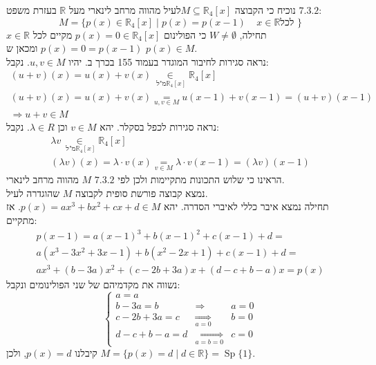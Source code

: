 \documentclass{article}
\newcommand\underrel[2]{\mathrel{\mathop{#2}\limits_{#1}}}
\DeclareMathOperator\Sp{Sp}
\begin{document}
נוכיח כי הקבוצה $M\subseteq \mathbb{R}_4[x]$לעיל מהווה מרחב לינארי מעל $\mathbb{R}$ בעזרת משפט $7.3.2$:
\[
    M=\{p(x)\in \mathbb{R}_4[x] \; | \; p(x) = p(x-1) \;\;\;\; x\in \mathbb{R} \text{לכל } \}
\]
תחילה, $W\ne \emptyset$
כי הפולינום $p(x)=0\in \mathbb{R}_4[x]$ מקיים לכל $x\in \mathbb{R}$ $p(x)=0=p(x-1)$ ומכאן ש $p(x)\in M$.\\
נראה סגירות לחיבור המוגדר בעמוד 155 בכרך ב. יהיו $u,v\in M$. נקבל:
\[
    \begin{matrix}
        (u + v)(x) = u(x)+v(x) \underrel{\text{ מ"ל} \mathbb{R}_4[x]}{\in} \mathbb{R}_4[x] \\
        (u+v)(x)=u(x)+v(x)\underrel{u,v\in M}{=} u(x-1)+v(x-1)=(u+v)(x-1)                  \\
        \Rightarrow u+v\in M
    \end{matrix}
\]
נראה סגירות לכפל בסקלר. יהא $v\in M$ וכן $\lambda \in R$. נקבל:
\[
    \begin{matrix}
        \lambda v \underrel{\text{ מ"ל} \mathbb{R}_4[x]}{\in} \mathbb{R}_4[x] \\
        (\lambda v)(x) = \lambda \cdot v(x) \underrel{v\in M}{=} \lambda \cdot v(x-1)= (\lambda v)(x-1)
    \end{matrix}
\]
הראינו כי שלוש התכונות מתקיימות ולכן לפי $7.3.2$ $M$ מהווה מרחב לינארי.\\
נמצא קבוצה פורשת סופית לקבוצה $M$ שהוגדרה לעיל. \\
תחילה נמצא איבר כללי לאיברי הסדרה. יהא $p(x)=ax^3+bx^2+cx+d\in M$. אז מתקיים:
\[
    \begin{matrix}
        p(x-1)=a(x-1)^3+b(x-1)^2+c(x-1)+d=     \\
        a(x^3-3x^2+3x-1)+b(x^2-2x+1)+c(x-1)+d= \\
        ax^3+(b-3a)x^2+(c-2b+3a)x+(d-c+b-a)x = p(x)
    \end{matrix}
\]
נשווה את מקדמיהם של שני הפולינומים ונקבל:
\[
    \left\{
    \begin{matrix}
        a=a                                              \\
        b-3a=b     & \Rightarrow                   & a=0 \\
        c-2b+3a=c  & \underrel{a=0}{\Rightarrow}   & b=0 \\
        d-c+b-a =d & \underrel{a=b=0}{\Rightarrow} & c=0
    \end{matrix}
    \right.
\]
קיבלנו $p(x)=d$, ולכן $M=\{ p(x)=d \; | \; d\in \mathbb{R} \} = \Sp\{1\}$.
\end{document}
